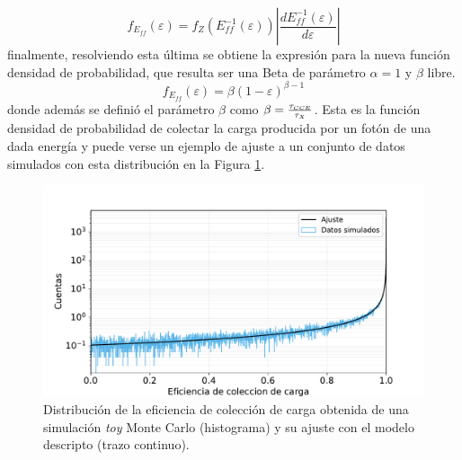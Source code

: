 \begin{equation*}
    f_{E_{ff}}(\varepsilon) 
    = f_{Z}
    \left(
        E_{ff}^{-1}(\varepsilon)
    \right)
    \left|
        \frac{dE_{ff}^{-1}(\varepsilon)}{d\varepsilon}
    \right|
\end{equation*}
finalmente, resolviendo esta última se obtiene la expresión para la nueva función densidad de probabilidad, que resulta ser una Beta de parámetro $\alpha = 1$ y $\beta$ libre.
\begin{equation*}
    f_{E_{ff}}(\varepsilon) = \beta (1 - \varepsilon)^{\beta - 1}
\end{equation*}
donde además se definió el parámetro $\beta$ como $\beta = \frac{\tau_{\scaleto{CCE}{3pt}}}{\tau_{\scaleto{X}{3pt}}}$. 
Esta es la función densidad de probabilidad de colectar la carga producida por un fotón de una dada energía y puede verse un ejemplo de ajuste a un conjunto de datos simulados con esta distribución en la Figura \ref{fig:BetaDistyAjuste}.
\begin{figure}[h]
    \centering
        \includegraphics[scale=0.5]{Figs/BetaDistyAjuste.pdf}
    \caption{Distribución de la eficiencia de colección de carga obtenida de una simulación \textit{toy} Monte Carlo (histograma) y su ajuste con el modelo descripto (trazo continuo).}
    \label{fig:BetaDistyAjuste}
\end{figure}

